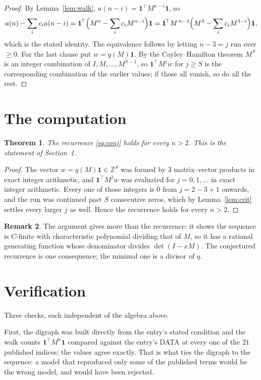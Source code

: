 \documentclass[11pt,a4paper]{article}
\theoremstyle{plain}
\newtheorem{theorem}{Theorem}
\theoremstyle{definition}
\newtheorem{remark}[theorem]{Remark}
\begin{document}
\begin{proof}
By Lemma~\ref{lem:walk}, $a(n-i)=\mathbf{1}^{\!\top}M^{n-i}\mathbf{1}$, so
\[
a(n)-\sum_i c_i a(n-i)
=\mathbf{1}^{\!\top}\Bigl(M^{n}-\sum_i c_i M^{n-i}\Bigr)\mathbf{1}
=\mathbf{1}^{\!\top}M^{\,n-3}\Bigl(M^{3}-\sum_i c_i M^{3-i}\Bigr)\mathbf{1},
\]
which is the stated identity. The equivalence follows by letting $n-3=j$ run over
$\ge0$. For the last clause put $w=q(M)\mathbf{1}$. By the Cayley--Hamilton theorem
$M^{S}$ is an integer combination of $I,M,\dots,M^{S-1}$, so
$\mathbf{1}^{\!\top}M^{j}w$ for $j\ge S$ is the corresponding combination of the
earlier values; if those all vanish, so do all the rest.
\end{proof}

\section{The computation}

\begin{theorem}
The recurrence \eqref{eq:conj} holds for every $n>2$. This is the statement of
Section~1.
\end{theorem}

\begin{proof}
The vector $w=q(M)\mathbf{1}\in\mathbb{Z}^{S}$ was formed by $3$ matrix--vector
products in exact integer arithmetic, and $\mathbf{1}^{\!\top}M^{j}w$ was evaluated for
$j=0,1,\dots$ in exact integer arithmetic. Every one of those integers is $0$ from
$j=2-3+1$ onwards, and the run was continued past $S$ consecutive zeros, which by
Lemma~\ref{lem:crit} settles every larger $j$ as well. Hence the recurrence holds for
every $n>2$.
\end{proof}

\begin{remark}
The argument gives more than the recurrence: it shows the sequence is $C$-finite with
characteristic polynomial dividing that of $M$, so it has a rational generating function
whose denominator divides $\det(I-xM)$. The conjectured recurrence is one consequence; the
minimal one is a divisor of $q$.
\end{remark}

\section{Verification}

Three checks, each independent of the algebra above.

First, the digraph was built directly from the entry's stated condition and the walk counts
$\mathbf{1}^{\!\top}M^{n}\mathbf{1}$ compared against the entry's DATA at every one of
the $21$ published indices; the values agree exactly. That is what ties the digraph to
the sequence: a model that reproduced only some of the published terms would be the wrong
model, and would have been rejected.
\end{document}
